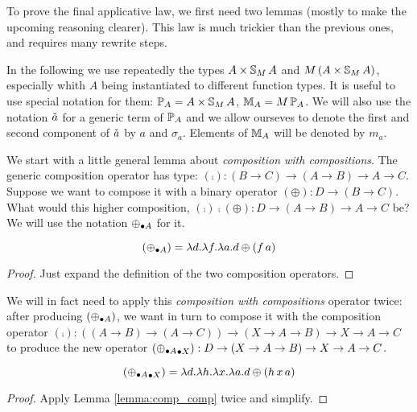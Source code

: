 
To prove the final applicative law, we first need two lemmas (mostly to make the upcoming reasoning clearer). This law is much trickier than the previous ones, and requires many rewrite steps.

In the following we use repeatedly the types $A\times \mathbb{S}_{M}\,A$ and $M\,(A\times \mathbb{S}_{M}\,A)$, especially whith $A$ being instantiated to different function types.
It is useful to use special notation for them:
$\mathbb{P}_{A} = A\times \mathbb{S}_{M}\,A$, $\mathbb{M}_{A} = M\,\mathbb{P}_{A}$.
We will also use the notation $\check{a}$ for a generic term of $\mathbb{P}_{A}$
and we allow ourseves to denote the first and second component of $\check{a}$ by $a$ and $\sigma_a$.
Elements of $\mathbb{M}_{A}$ will be denoted by $m_a$.

We start with a little general lemma about {\em composition with compositions}.
The generic composition operator has type: $(\comp): (B\rightarrow C) \rightarrow (A\rightarrow B) \rightarrow A \rightarrow C$.
Suppose we want to compose it with a binary operator $(\oplus) : D\rightarrow (B\rightarrow C)$.
What would this higher composition, $(\comp) \comp (\oplus) : D \rightarrow (A\rightarrow B) \rightarrow A \rightarrow C$ be?
We will use the notation $\mathbin{\oplus_{\bullet A}}$ for it.
\begin{lemma}\label{lemma:comp_comp}
$$
(\mathbin{\oplus_{\bullet A}}) = \lambda d.\lambda f. \lambda a. d\oplus (f\,a)
$$
\end{lemma}
\begin{proof}
Just expand the definition of the two composition operators.
\end{proof}

We will in fact need to apply this {\em composition with compositions} operator twice: after producing $(\mathbin{\oplus_{\bullet A}})$, we want in turn to compose it with the composition operator $(\comp): ((A\rightarrow B) \rightarrow (A\rightarrow C)) \rightarrow (X\rightarrow A\rightarrow B) \rightarrow X \rightarrow A \rightarrow C$ to produce the new operator $(\mathbin{\mathbin{\oplus_{\bullet A}}_{\bullet X}}): D\rightarrow (X\rightarrow A \rightarrow B) \rightarrow X \rightarrow A \rightarrow C$.
\begin{lemma}\label{lemma:comp_comp_comp}
$$
(\mathbin{\mathbin{\oplus_{\bullet A}}_{\bullet X}}) =
\lambda d. \lambda h. \lambda x.\lambda a. d\oplus (h\,x\,a)
$$
\end{lemma}
\begin{proof}
Apply Lemma \ref{lemma:comp_comp} twice and simplify.
\end{proof}

